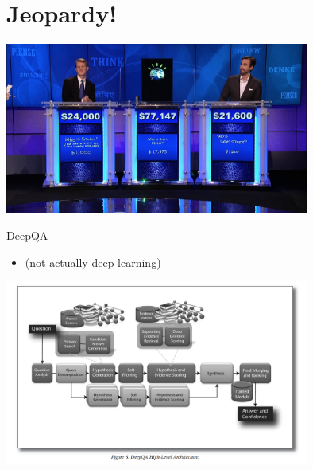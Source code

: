 \documentclass{beamer}
\begin{document}
{

}


{

}



{

}

{

}



{

}



\section{Jeopardy!}

\begin{frame}
  \begin{center}
    \includegraphics[width=10cm]{IBMwatson}
  \end{center}
\end{frame}

\begin{frame}{DeepQA}
  \begin{itemize}
  \item (not actually deep learning)
  \end{itemize}
\end{frame}

\begin{frame}
  \begin{center}
    \includegraphics[width=10cm]{deepqa}
  \end{center}
\end{frame}
\end{document}
